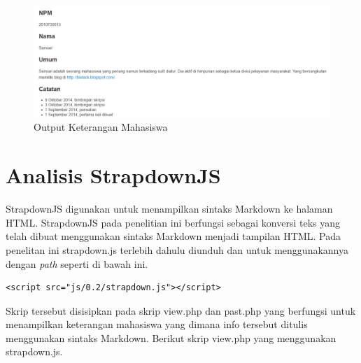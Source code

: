 \begin{figure}[pt]
\centering
\includegraphics[scale=0.45]{Gambar/overall.png}
\caption[Output Keterangan Mahasiswa]{Output Keterangan Mahasiswa} 
\label{fig:overall}
\end{figure}

\section{Analisis StrapdownJS}
\label{sec:analisisStrapdownJS}
StrapdownJS digunakan untuk menampilkan sintaks Markdown ke halaman HTML. StrapdownJS pada penelitian ini berfungsi sebagai konversi teks yang telah dibuat menggunakan sintaks Markdown menjadi tampilan HTML. Pada penelitan ini strapdown.js terlebih dahulu diunduh dan untuk menggunakannya dengan {\it path} seperti di bawah ini.
\begin{lstlisting}[basicstyle=\footnotesize]
<script src="js/0.2/strapdown.js"></script>
\end{lstlisting}
Skrip tersebut disisipkan pada skrip view.php dan past.php yang berfungsi untuk menampilkan keterangan mahasiswa yang dimana info tersebut ditulis menggunakan sintaks Markdown. Berikut skrip view.php yang menggunakan strapdown.js.
